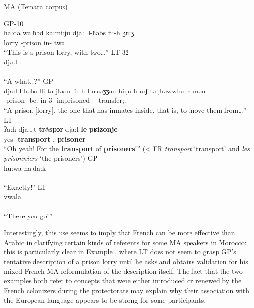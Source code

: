 \documentclass[output=paper]{langscibook}
\begin{document}
\begin{exe}
	\ex\label{falchetta:ex:12} \gls*{MA} (Temara corpus)
	\begin{xlist}
		\ex GP-10 \\
		\gll ha:da  wa:ħǝd   ka:mi:ju   dja:l   l-ħǝbs   fi:-h   ʒu:ʒ \\
		\DEM{} \INDF{} lorry \GEN{} \DEF-prison in-\Third\M\SG{} two \\
		\glt “This is a prison lorry, with two\dots”
		\ex LT-32 \\
		\gll dja:l \\
		\GEN{} \\
		\glt “A what\dots?”
		\ex GP \\
		\gll dja:l l-ħǝbs   lli   tǝ-jku:n   fi:-h   l-msǝʒʒǝn   hi:ja b-a:ʃ   tǝ-jħǝwwlu:-h   mǝn \\
		\GEN{} \DEF-prison \REL{} \PRVB-be.\Third\M\SG{} in-3\M\SG{} \DEF-imprisoned \Third\F\SG{} \PREP-\REL{} \PRVB-transfer;\IPFV.\Third\PL-\Third\M\SG{} \PREP \\
		\glt “A prison [lorry], the one that has inmates inside, that is, to move them from\dots”
		\ex LT \\
		\gll ʔa:h dja:l t-\textbf{trãspͻr} dja:l \textbf{le} \textbf{pʁizonje} \\
		yes \GEN{} \DEF-\textbf{transport} \GEN{} \textbf{\DEF.\PL} \textbf{prisoner} \\
		\glt “Oh yeah! For the \textbf{transport} of \textbf{prisoners}!” (< FR \textit{transport} ‘transport’ and \textit{les prisonniers} ‘the prisoners’)
		\newpage
		\ex GP \\
		\gll hu:wa   ha:da:k \\
		\Third\M\SG{} \DEM{} \\
		\glt “Exactly!”
		\ex LT \\
		\gll vwala \\
		\INTRJ \\
		\glt “There you go!”
	\end{xlist}
\end{exe}


Interestingly, this use seems to imply that French can be more effective than Arabic in clarifying certain kinds of referents for some \gls*{MA} speakers in Morocco; this is particularly clear in Example , where LT does not seem to grasp GP’s tentative description of a prison lorry until he asks and obtains validation for his mixed French-\gls*{MA} reformulation of the description itself. The fact that the two examples both refer to concepts that were either introduced or renewed by the French colonizers during the protectorate may explain why their association with the European language appears to be strong for some participants. 
\end{document}
